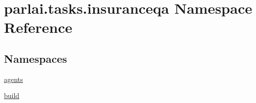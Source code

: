 \hypertarget{namespaceparlai_1_1tasks_1_1insuranceqa}{}\section{parlai.\+tasks.\+insuranceqa Namespace Reference}
\label{namespaceparlai_1_1tasks_1_1insuranceqa}
\subsection*{Namespaces}
\begin{DoxyCompactItemize}
\item 
 \hyperlink{namespaceparlai_1_1tasks_1_1insuranceqa_1_1agents}{agents}
\item 
 \hyperlink{namespaceparlai_1_1tasks_1_1insuranceqa_1_1build}{build}
\end{DoxyCompactItemize}

